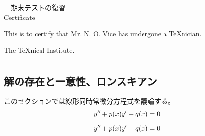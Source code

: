 \documentclass[fleqn]{jsarticle}
\begin{document}
\begin{center}
　期末テストの復習\\[.75cm] Certificate
\end{center}
\noindent This is to certify that Mr. N. O. Vice has undergone a \TeX nician.
\begin{flushright}
  The \TeX nical Institute.
\end{flushright}
  \setcounter{section}{1}
\section{}
  \setcounter{subsection}{5}
    \subsection{解の存在と一意性、ロンスキアン}
      このセクションでは線形同時常微分方程式を議論する。 
    \begin{equation}
      y '' + p(x)y' +q(x) = 0 \\
    \end{equation}
 
    \begin{equation}
      y '' + p(x)y' +q(x) = 0 \\
    \end{equation}
\end{document}
